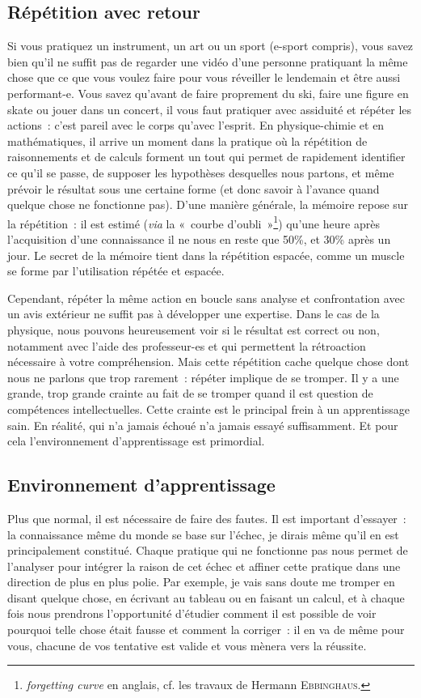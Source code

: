 \documentclass[a4paper, 12pt, final, garamond]{book}
\begin{document}
\subsection{Répétition avec retour}

Si vous pratiquez un instrument, un art ou un sport (e-sport compris), vous
savez bien qu'il ne suffit pas de regarder une vidéo d'une personne pratiquant
la même chose que ce que vous voulez faire pour vous réveiller le lendemain et
être aussi performant-e. Vous savez qu'avant de faire proprement du ski, faire
une figure en skate ou jouer dans un concert, il vous faut pratiquer avec
assiduité et répéter les actions~: c'est pareil avec le corps qu'avec l'esprit.
En physique-chimie et en mathématiques, il arrive un moment dans la pratique où
la répétition de raisonnements et de calculs forment un tout qui permet de
rapidement identifier ce qu'il se passe, de supposer les hypothèses desquelles
nous partons, et même prévoir le résultat sous une certaine forme (et donc
savoir à l'avance quand quelque chose ne fonctionne pas). D'une manière
générale, la mémoire repose sur la répétition~: il est estimé (\textit{via} la
«~courbe d'oubli~»\footnote{\textit{forgetting curve} en anglais, cf. les
travaux de Hermann \textsc{Ebbinghaus}.}) qu'une heure après l'acquisition
d'une connaissance il ne nous en reste que 50\%, et 30\% après un jour. Le
secret de la mémoire tient dans la répétition espacée, comme un muscle se forme
par l'utilisation répétée et espacée.

Cependant, répéter la même action en boucle sans analyse et confrontation avec
un avis extérieur ne suffit pas à développer une expertise. Dans le cas de la
physique, nous pouvons heureusement voir si le résultat est correct ou non,
notamment avec l'aide des professeur-es et qui permettent la rétroaction
nécessaire à votre compréhension. Mais cette répétition cache quelque chose dont
nous ne parlons que trop rarement~: répéter implique de se tromper. Il y a une
grande, trop grande crainte au fait de se tromper quand il est question de
compétences intellectuelles. Cette crainte est le principal frein à un
apprentissage sain. En réalité, qui n'a jamais échoué n'a jamais essayé
suffisamment. Et pour cela l'environnement d'apprentissage est primordial.

\subsection{Environnement d'apprentissage}

Plus que normal, il est nécessaire de faire des fautes. Il est important
d'essayer~: la connaissance même du monde se base sur l'échec, je dirais même
qu'il en est principalement constitué. Chaque pratique qui ne fonctionne pas
nous permet de l'analyser pour intégrer la raison de cet échec et affiner cette
pratique dans une direction de plus en plus polie. Par exemple, je vais sans
doute me tromper en disant quelque chose, en écrivant au tableau ou en faisant
un calcul, et à chaque fois nous prendrons l'opportunité d'étudier comment il
est possible de voir pourquoi telle chose était fausse et comment la corriger~:
il en va de même pour vous, chacune de vos tentative est valide et vous mènera
vers la réussite.
\end{document}
